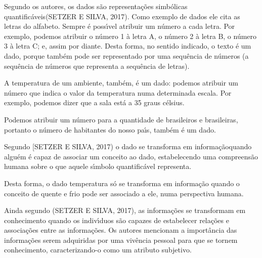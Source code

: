 \documentclass[
12pt,		%
openright,	%
twoside,  %
a4paper,			%
chapter=TITLE,		%
english,			%
french,				%
spanish,			%
brazil				%
]{USPSC-classe/USPSC}
\begin{document}
Segundo os autores, os \textquotedbl  dados \textquotedbl  s\~ao \textquotedbl representa\c{c}\~oes simb\'olicas quantific\'aveis\textquotedbl  (SETZER E SILVA, 2017). Como exemplo de dados ele cita as letras do alfabeto. Sempre \'e poss\'{\i}vel atribuir um n\'umero a cada letra. Por exemplo, podemos atribuir o n\'umero 1 \`a letra A, o n\'umero 2 \`a letra B, o n\'umero 3 \`a letra C; e, assim por diante. Desta forma, no sentido indicado, o texto \'e um dado, porque tamb\'em pode ser representado por uma sequ\^encia de n\'umeros (a sequ\^encia de n\'umeros que representa a sequ\^encia de letras).









A temperatura de um ambiente, tamb\'em, \'e um dado: podemos atribuir um n\'umero que indica o valor da temperatura numa determinada escala. Por exemplo, podemos dizer que a sala \textquotedbl est\'a a 35 graus c\'elsius\textquotedbl .









Podemos atribuir um n\'umero para a quantidade de brasileiros e brasileiras, portanto o n\'umero de habitantes do nosso pa\'{\i}s, tamb\'em \'e um dado.









Segundo [SETZER E SILVA, 2017) o dado se transforma em \textquotedbl informa\c{c}\~ao\textquotedbl  quando algu\'em \'e capaz de associar um conceito ao dado, estabelecendo uma compreens\~ao humana sobre o que aquele s\'{\i}mbolo quantific\'avel representa.









Desta forma, o dado \textquotedbl  temperatura \textquotedbl  s\'o se transforma em informa\c{c}\~ao quando o conceito de \textquotedbl  quente \textquotedbl  e \textquotedbl  frio \textquotedbl  pode ser associado a ele, numa perspectiva humana.









Ainda segundo (SETZER E SILVA, 2017), as informa\c{c}\~oes se transformam em conhecimento quando os indiv\'{\i}duos s\~ao capazes de estabelecer rela\c{c}\~oes e associa\c{c}\~oes entre as informa\c{c}\~oes. Os autores mencionam a import\^ancia das informa\c{c}\~oes serem adquiridas por uma viv\^encia pessoal para que se tornem conhecimento, caracterizando-o como um atributo subjetivo.
\end{document}
